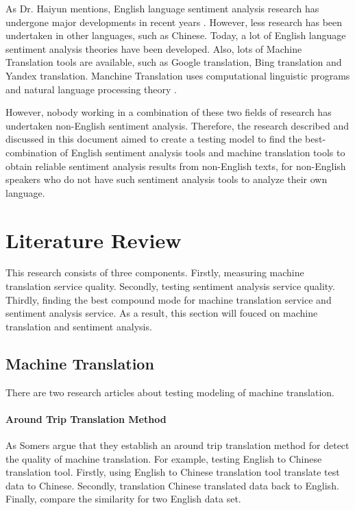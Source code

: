 \documentclass[conference]{IEEEtran}
\begin{document}
As Dr. Haiyun mentions, English language sentiment analysis research has
undergone major developments in recent years \cite{ChineseSentimentAnalysis}.
However, less research has been undertaken in other languages, such as Chinese.
Today, a lot of English language sentiment analysis theories have been
developed. Also, lots of Machine Translation tools are available, such as Google
translation, Bing translation and Yandex translation.
Manchine Translation uses computational linguistic programs and natural language
processing theory \cite{machineTranslation}.

However, nobody working in a combination of these two fields of research has undertaken non-English
sentiment analysis. Therefore, the research described and discussed in this
document aimed to create a testing model to find the best-combination of English
sentiment analysis tools and machine translation tools to obtain reliable
sentiment analysis results from non-English texts, for non-English speakers who
do not have such sentiment analysis tools to analyze their own language.
\section{Literature Review}
This research consists of three components.
Firstly, measuring machine translation service quality.
Secondly, testing sentiment analysis service quality.
Thirdly, finding the best compound mode for machine translation service and
sentiment analysis service.
As a result, this section will fouced on machine translation and sentiment
analysis.

\subsection{Machine Translation}
There are two research articles about testing modeling of machine translation.

\paragraph{Around Trip Translation Method}
\cite{roundTripTranslation}
As Somers argue that they establish an around trip translation method for detect
the quality of machine translation.
For example, testing English to Chinese translation tool.
Firstly, using English to Chinese translation tool translate test data to
Chinese.
Secondly, translation Chinese translated data back to English.
Finally, compare the similarity for two English data set.
\end{document}
